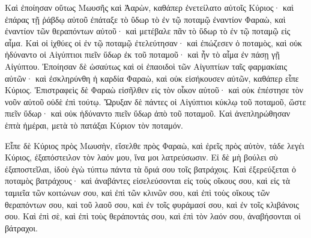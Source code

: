 {Καὶ ἐποίησαν οὕτως Μωυσῆς καὶ Ἀαρὼν, καθάπερ ἐνετείλατο αὐτοῖς Κύριος· καὶ ἐπάρας τῇ ῥάβδῳ αὐτοῦ ἐπάταξε τὸ ὕδωρ τὸ ἐν τῷ ποταμῷ ἐναντίον Φαραὼ, καὶ ἐναντίον τῶν θεραπόντων αὐτοῦ· καὶ μετέβαλε πᾶν τὸ ὕδωρ τὸ ἐν τῷ ποταμῷ εἰς αἷμα.
Καὶ οἱ ἰχθύες οἱ ἐν τῷ ποταμῷ ἐτελεύτησαν· καὶ ἐπώζεσεν ὁ ποταμὸς, καὶ οὐκ ἠδύναντο οἱ Αἰγύπτιοι πιεῖν ὕδωρ ἐκ τοῦ ποταμοῦ· καὶ ἦν τὸ αἷμα ἐν πάσῃ γῇ Αἰγύπτου.
Ἐποίησαν δὲ ὡσαύτως καὶ οἱ ἐπαοιδοὶ τῶν Αἰγυπτίων ταῖς φαρμακίαις αὐτῶν· καὶ ἐσκληρύνθη ἡ καρδία Φαραὼ, καὶ οὐκ εἰσήκουσεν αὐτῶν, καθάπερ εἶπε Κύριος.
Ἐπιστραφεὶς δὲ Φαραὼ εἰσῆλθεν εἰς τὸν οἶκον αὐτοῦ· καὶ οὐκ ἐπέστησε τὸν νοῦν αὐτοῦ οὐδὲ ἐπὶ τούτῳ.
Ὤρυξαν δὲ πάντες οἱ Αἰγύπτιοι κύκλῳ τοῦ ποταμοῦ, ὥστε πιεῖν ὕδωρ· καὶ οὐκ ἠδύναντο πιεῖν ὕδωρ ἀπὸ τοῦ ποταμοῦ.
Καὶ ἀνεπληρώθησαν ἑπτὰ ἡμέραι, μετὰ τὸ πατάξαι Κύριον τὸν ποταμόν.
\par }{\PP {}Εἶπε δὲ Κύριος πρὸς Μωυσὴν, εἴσελθε πρὸς Φαραὼ, καὶ ἐρεῖς πρὸς αὐτὸν, τάδε λεγέι Κύριος, ἐξαπόστειλον τὸν λαόν μου, ἵνα μοι λατρεύσωσιν.
Εἰ δὲ μὴ βούλει σὺ ἐξαποστεῖλαι, ἰδοὺ ἐγὼ τύπτω πάντα τὰ ὅριά σου τοῖς βατράχοις.
Καὶ ἐξερεύξεται ὁ ποταμὸς βατράχους· καὶ ἀναβάντες εἰσελεύσονται εἰς τοὺς οἴκους σου, καὶ εἰς τὰ ταμιεῖα τῶν κοιτώνων σου, καὶ ἐπὶ τῶν κλινῶν σου, καὶ ἐπὶ τοὺς οἴκους τῶν θεραπόντων σου, καὶ τοῦ λαοῦ σου, καὶ ἐν τοῖς φυράμασί σου, καὶ ἐν τοῖς κλιβάνοις σου.
Καὶ ἐπὶ σὲ, καὶ ἐπὶ τοὺς θεράποντάς σου, καὶ ἐπὶ τὸν λαόν σου, ἀναβήσονται οἱ βάτραχοι.

}
